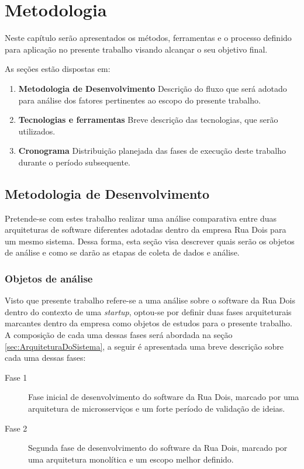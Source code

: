\chapter{Metodologia}

Neste capítulo serão apresentados os métodos, ferramentas e o processo definido
para aplicação no presente trabalho visando alcançar o seu objetivo final.

  As seções estão dispostas em:

  \begin{enumerate}
    \item \textbf{Metodologia de Desenvolvimento} Descrição do fluxo que será
    adotado para análise dos fatores pertinentes ao escopo do presente trabalho.
    \item \textbf{Tecnologias e ferramentas} Breve descrição das tecnologias,
    que serão utilizados.
    \item \textbf{Cronograma} Distribuição planejada das fases de execução deste
    trabalho durante o período subsequente.
  \end{enumerate}

\section{Metodologia de Desenvolvimento}

Pretende-se com estes trabalho realizar uma análise comparativa entre duas
arquiteturas de software diferentes adotadas dentro da empresa Rua Dois para um
mesmo sistema. Dessa forma, esta seção visa descrever quais serão os objetos de
análise e como se darão as etapas de coleta de dados e análise.

\subsection{Objetos de análise}

Visto que presente trabalho refere-se a uma análise sobre o software da Rua Dois
dentro do contexto de uma \textit{startup}, optou-se por definir duas fases arquiteturais
marcantes dentro da empresa como objetos de estudos para o presente trabalho. A composição
de cada uma dessas fases será abordada na seção \ref{sec:ArquiteturaDoSistema}, a
seguir é apresentada uma breve descrição sobre cada uma dessas fases:

    \begin{description}
        \item [Fase 1] Fase inicial de desenvolvimento do software da Rua Dois,
        marcado por uma arquitetura de microsserviços e um forte período de validação
        de ideias.
        \item [Fase 2] Segunda fase de desenvolvimento do software da Rua Dois,
        marcado por uma arquitetura monolítica e um escopo melhor definido.
    \end{description}

